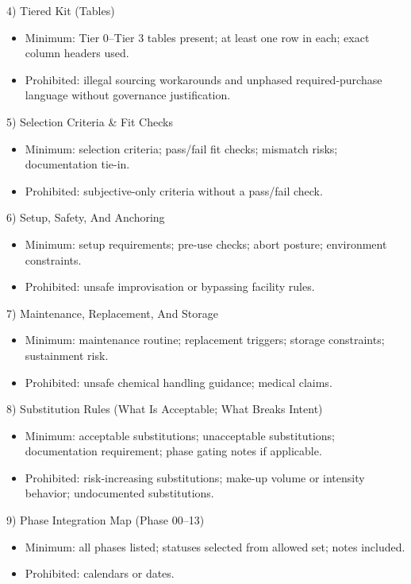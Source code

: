 \documentclass[10pt]{article}
\begin{document}
4) Tiered Kit (Tables)

\begin{itemize}
\item Minimum: Tier 0–Tier 3 tables present; at least one row in each; exact column headers used.
\item Prohibited: illegal sourcing workarounds and unphased required-purchase language without governance justification.
\end{itemize}

5) Selection Criteria \& Fit Checks

\begin{itemize}
\item Minimum: selection criteria; pass/fail fit checks; mismatch risks; documentation tie-in.
\item Prohibited: subjective-only criteria without a pass/fail check.
\end{itemize}

6) Setup, Safety, And Anchoring

\begin{itemize}
\item Minimum: setup requirements; pre-use checks; abort posture; environment constraints.
\item Prohibited: unsafe improvisation or bypassing facility rules.
\end{itemize}

7) Maintenance, Replacement, And Storage

\begin{itemize}
\item Minimum: maintenance routine; replacement triggers; storage constraints; sustainment risk.
\item Prohibited: unsafe chemical handling guidance; medical claims.
\end{itemize}

8) Substitution Rules (What Is Acceptable; What Breaks Intent)

\begin{itemize}
\item Minimum: acceptable substitutions; unacceptable substitutions; documentation requirement; phase gating notes if applicable.
\item Prohibited: risk-increasing substitutions; make-up volume or intensity behavior; undocumented substitutions.
\end{itemize}

9) Phase Integration Map (Phase 00–13)

\begin{itemize}
\item Minimum: all phases listed; statuses selected from allowed set; notes included.
\item Prohibited: calendars or dates.
\end{itemize}
\end{document}
